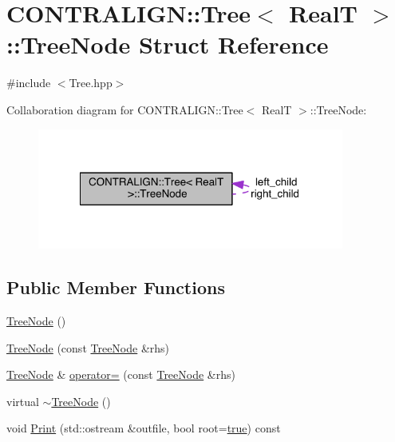 \hypertarget{struct_c_o_n_t_r_a_l_i_g_n_1_1_tree_1_1_tree_node}{\section{C\+O\+N\+T\+R\+A\+L\+I\+G\+N\+:\+:Tree$<$ Real\+T $>$\+:\+:Tree\+Node Struct Reference}
\label{struct_c_o_n_t_r_a_l_i_g_n_1_1_tree_1_1_tree_node}
}


{\ttfamily \#include $<$Tree.\+hpp$>$}



Collaboration diagram for C\+O\+N\+T\+R\+A\+L\+I\+G\+N\+:\+:Tree$<$ Real\+T $>$\+:\+:Tree\+Node\+:
\nopagebreak
\begin{figure}[H]
\begin{center}
\leavevmode
\includegraphics[width=286pt]{struct_c_o_n_t_r_a_l_i_g_n_1_1_tree_1_1_tree_node__coll__graph}
\end{center}
\end{figure}
\subsection*{Public Member Functions}
\begin{DoxyCompactItemize}
\item 
\hyperlink{struct_c_o_n_t_r_a_l_i_g_n_1_1_tree_1_1_tree_node_a5dae7f5370988a8d3ac290d64535f5c3}{Tree\+Node} ()
\item 
\hyperlink{struct_c_o_n_t_r_a_l_i_g_n_1_1_tree_1_1_tree_node_a98abbaa188f6b68747d62b3117474c97}{Tree\+Node} (const \hyperlink{struct_c_o_n_t_r_a_l_i_g_n_1_1_tree_1_1_tree_node}{Tree\+Node} \&rhs)
\item 
\hyperlink{struct_c_o_n_t_r_a_l_i_g_n_1_1_tree_1_1_tree_node}{Tree\+Node} \& \hyperlink{struct_c_o_n_t_r_a_l_i_g_n_1_1_tree_1_1_tree_node_af83f5e9417422d9738f861c0521dfb15}{operator=} (const \hyperlink{struct_c_o_n_t_r_a_l_i_g_n_1_1_tree_1_1_tree_node}{Tree\+Node} \&rhs)
\item 
virtual \hyperlink{struct_c_o_n_t_r_a_l_i_g_n_1_1_tree_1_1_tree_node_a58da699ad7112fd46a0a1bc3cf05029f}{$\sim$\+Tree\+Node} ()
\item 
void \hyperlink{struct_c_o_n_t_r_a_l_i_g_n_1_1_tree_1_1_tree_node_a86f165d26dab0e4916f2a9d487ba6f49}{Print} (std\+::ostream \&outfile, bool root=\hyperlink{naview_8c_a41f9c5fb8b08eb5dc3edce4dcb37fee7}{true}) const 
\end{DoxyCompactItemize}

